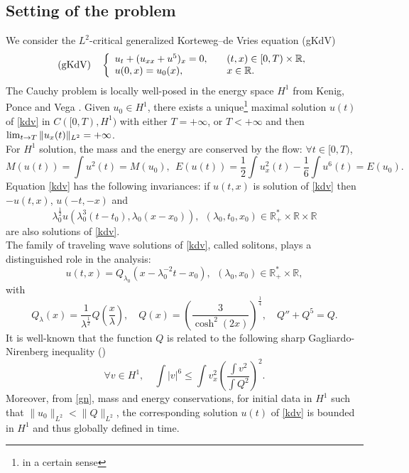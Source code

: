 \documentclass[11pt,a4paper,reqno]{amsart}
\theoremstyle{remark}
\numberwithin{equation}{section}
\newcommand{\be}{\begin{equation}}
\newcommand{\ee}{\end{equation}}
\def\RR{\mathbb{R}}
\def\RR{\mathbb{R}}
\def\lim{\mathop{\rm lim}}
\def\l{\lambda}
\begin{document}
\subsection{Setting of the problem}
We consider the $L^2$-critical generalized Korteweg--de Vries equation (gKdV) 
\begin{equation}\label{kdv}
{\rm (gKdV)}\quad  \left\{\begin{array}{ll}
 u_t + (u_{xx} + u^5)_x =0, \quad & (t,x)\in [0,T)\times {\mathbb R}, \\
 u(0,x)= u_0(x), & x\in {\mathbb R}.
\end{array}
\right.
\end{equation}
The Cauchy problem is locally well-posed in the energy space $H^1$ from Kenig, Ponce and Vega \cite{KPV,KPV2}. Given $u_0 \in H^1$, there exists a unique\footnote{in a certain sense} maximal solution $u(t)$ of \eqref{kdv} in $C([0,T), H^1)$ with either $T=+\infty$, or $T<+\infty$ and then $\lim_{t\to T} \|u_x(t)\|_{L^2} = +\infty$.\\
For $H^1$ solution, the mass and the energy are conserved by the flow: $\forall t\in [0,T)$,  $$M(u(t))=\int u^2(t)= M(u_0), \ \ E(u(t))= \frac 12 \int u_x^2(t) - \frac 16 \int u^6(t)= E(u_0).$$
Equation \eqref{kdv} has the following invariances: if $u(t,x)$ is solution of \eqref{kdv} then $-u(t,x)$, $ u(-t,-x)$ and 
 $$\lambda_0^{\frac12}u(\lambda_0^3 (t-t_0),\lambda_0 (x -x_0)), \ \ (\l_0,t_0,x_0)\in \RR^*_+\times \RR\times \RR$$ are also  solutions of \eqref{kdv}.\\
The family of  traveling wave solutions of \eqref{kdv},  called solitons, plays a distinguished role in the analysis:
$$u(t,x) = Q_{\l_0}(x-\l_0^{-2} t-x_0), \ \ (\l_0,x_0)\in\RR^*_+\times \RR,$$ with  
\begin{equation}\label{eq:Q}
Q_\l(x) = \frac{1}{\l^{\frac 12} }Q \left(\frac x\l\right) ,\quad Q(x) =   \left(\frac {3}{\cosh^{2}\left( 2 x\right)}\right)^{\frac14}, \quad
Q''+Q^5 =Q.
\end{equation}
It is well-known that the function $Q$ is related to the following sharp Gagliardo-Nirenberg inequality (\cite{W1983})
\be\label{gn}
\forall v\in H^1,\quad
\int |v|^6 \leq \int v_x^2 \left(\frac {\int v^2}{\int Q^2}\right)^2.
\ee
Moreover,  from   \eqref{gn},   mass and energy conservations, for
initial data in $H^1$  such that $\|u_0\|_{L^2}<\|Q\|_{L^2}$, the corresponding solution $u(t)$ of \eqref{kdv} is bounded in $H^1$ and thus globally defined in time.
\end{document}

